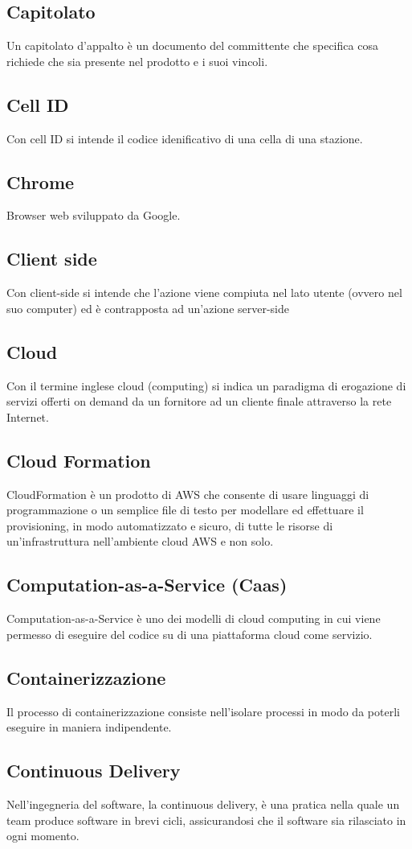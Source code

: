 \subsection{Capitolato}  Un capitolato d'appalto è un documento del committente che specifica cosa richiede che sia presente nel prodotto e i suoi vincoli.
\subsection{Cell ID}  Con cell ID si intende il codice idenificativo di una cella di una stazione.
\subsection{Chrome}  Browser web sviluppato da Google.
\subsection{Client side}  Con client-side si intende che l'azione viene compiuta nel lato utente (ovvero nel suo computer) ed è contrapposta ad un'azione server-side
\subsection{Cloud}  Con il termine inglese cloud (computing) si indica un paradigma di erogazione di servizi offerti on demand da un fornitore ad un cliente finale attraverso la rete Internet. 
\subsection{Cloud Formation}  CloudFormation è un prodotto di AWS che consente di usare linguaggi di programmazione o un semplice file di testo per modellare ed effettuare il provisioning, in modo automatizzato e sicuro, di tutte le risorse di un'infrastruttura nell'ambiente cloud AWS e non solo.
\subsection{Computation-as-a-Service (Caas)}  Computation-as-a-Service è uno dei modelli di cloud computing in cui viene permesso di eseguire del codice su di una piattaforma cloud come servizio.
\subsection{Containerizzazione}  Il processo di containerizzazione consiste nell'isolare processi in modo da poterli eseguire in maniera indipendente.
\subsection{Continuous Delivery}  Nell'ingegneria del software, la continuous delivery, è una pratica nella quale un team produce software in brevi cicli, assicurandosi che il software sia rilasciato in ogni momento.
